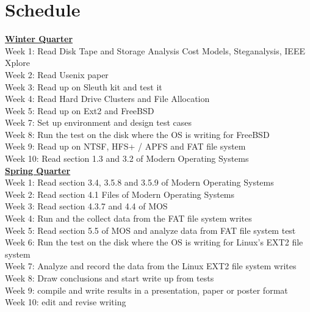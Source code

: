 \documentclass[a4paper]{article}
\begin{document}
\section{Schedule}
\textbf{\underline{Winter Quarter}}\\
Week 1: Read Disk Tape and Storage Analysis Cost Models, Steganalysis, IEEE Xplore\\
Week 2: Read Usenix paper\\
Week 3: Read up on Sleuth kit and test it\\
Week 4: Read Hard Drive Clusters and File Allocation\\
Week 5: Read up on Ext2 and FreeBSD\\
Week 7: Set up environment and design test cases\\
Week 8: Run the test on the disk where the OS is writing for FreeBSD\\
Week 9: Read up on NTSF, HFS+ / APFS and FAT file system\\
Week 10: Read section 1.3 and 3.2 of Modern Operating Systems\\

\textbf{\underline{Spring Quarter}}\\
Week 1: Read section 3.4, 3.5.8 and 3.5.9 of Modern Operating Systems\\
Week 2: Read section 4.1 Files of Modern Operating Systems\\
Week 3: Read section 4.3.7 and 4.4 of MOS\\
Week 4: Run and the collect data from the FAT file system writes\\
Week 5: Read section 5.5 of MOS and analyze data from FAT file system test\\
Week 6: Run the test on the disk where the OS is writing for Linux’s EXT2 file system\\
Week 7: Analyze and record the data from the Linux EXT2 file system writes\\
Week 8: Draw conclusions and start write up from tests\\
Week 9: compile and write results in a presentation, paper or poster format\\
Week 10: edit and revise writing\\
\end{document}
